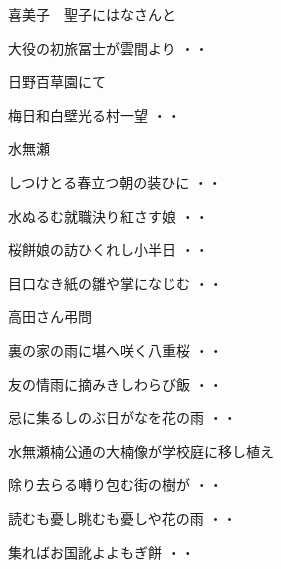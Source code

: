 喜美子　聖子にはなさんと
\begin{shiika}大役の初旅冨士が雲間より
\hfill{・・}\end{shiika}
\vspace{ 0.4cm}
日野百草園にて
\begin{shiika}梅日和白壁光る村一望
\hfill{・・}\end{shiika}
\vspace{ 0.4cm}
水無瀬
\begin{shiika}しつけとる春立つ朝の装ひに
\hfill{・・}\end{shiika}
\begin{shiika}水ぬるむ就職決り紅さす娘
\hfill{・・}\end{shiika}
\begin{shiika}桜餅娘の訪ひくれし小半日
\hfill{・・}\end{shiika}
\begin{shiika}目口なき紙の雛や掌になじむ
\hfill{・・}\end{shiika}
\vspace{ 0.4cm}
高田さん弔問
\begin{shiika}裏の家の雨に堪へ咲く八重桜
\hfill{・・}\end{shiika}
\begin{shiika}友の情雨に摘みきしわらび飯
\hfill{・・}\end{shiika}
\begin{shiika}忌に集るしのぶ日がなを花の雨
\hfill{・・}\end{shiika}
\vspace{ 0.4cm}
水無瀬楠公通の大楠像が学校庭に移し植え
\begin{shiika}除り去らる囀り包む街の樹が
\hfill{・・}\end{shiika}
\begin{shiika}読むも憂し眺むも憂しや花の雨
\hfill{・・}\end{shiika}
\begin{shiika}集ればお国訛よよもぎ餅
\hfill{・・}\end{shiika}
\vspace{ 0.4cm}
